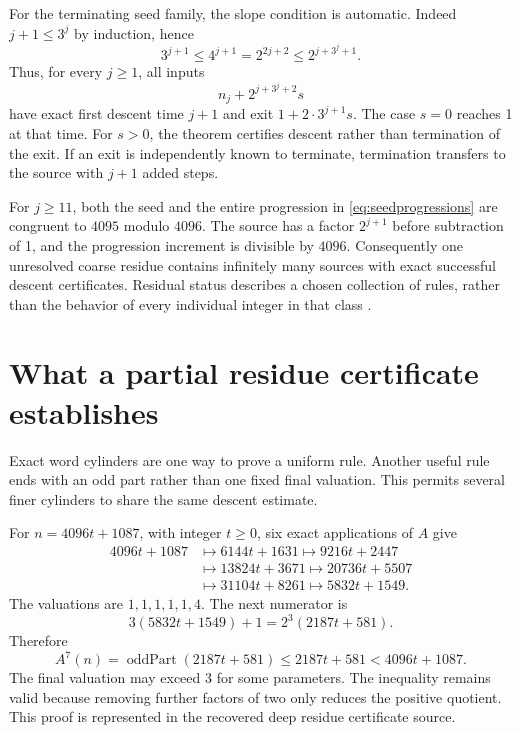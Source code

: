 For the terminating seed family, the slope condition is automatic. Indeed $j+1\le3^j$ by induction, hence
\[
3^{j+1}\le4^{j+1}=2^{2j+2}\le2^{j+3^j+1}.
\]
Thus, for every $j\ge1$, all inputs
\begin{equation}\label{eq:seedprogressions}
n_j+2^{j+3^j+2}s
\end{equation}
have exact first descent time $j+1$ and exit $1+2\cdot3^{j+1}s$. The case $s=0$ reaches 1 at that time. For $s>0$, the theorem certifies descent rather than termination of the exit. If an exit is independently known to terminate, termination transfers to the source with $j+1$ added steps.

For $j\ge11$, both the seed and the entire progression in \eqref{eq:seedprogressions} are congruent to $4095$ modulo $4096$. The source has a factor $2^{j+1}$ before subtraction of 1, and the progression increment is divisible by $4096$. Consequently one unresolved coarse residue contains infinitely many sources with exact successful descent certificates. Residual status describes a chosen collection of rules, rather than the behavior of every individual integer in that class \cite{projectcollatzlifts,projectcollatzboundary}.

\section{What a partial residue certificate establishes}
Exact word cylinders are one way to prove a uniform rule. Another useful rule ends with an odd part rather than one fixed final valuation. This permits several finer cylinders to share the same descent estimate.

\begin{example}\label{ex:1087}
For $n=4096t+1087$, with integer $t\ge0$, six exact applications of $A$ give
\begin{align*}
4096t+1087&\longmapsto6144t+1631\longmapsto9216t+2447\\
&\longmapsto13824t+3671\longmapsto20736t+5507\\
&\longmapsto31104t+8261\longmapsto5832t+1549.
\end{align*}
The valuations are $1,1,1,1,1,4$. The next numerator is
\[
3(5832t+1549)+1=2^3(2187t+581).
\]
Therefore
\[
A^7(n)=\operatorname{oddPart}(2187t+581)
\le2187t+581<4096t+1087.
\]
The final valuation may exceed 3 for some parameters. The inequality remains valid because removing further factors of two only reduces the positive quotient. This proof is represented in the recovered deep residue certificate source.
\end{example}


